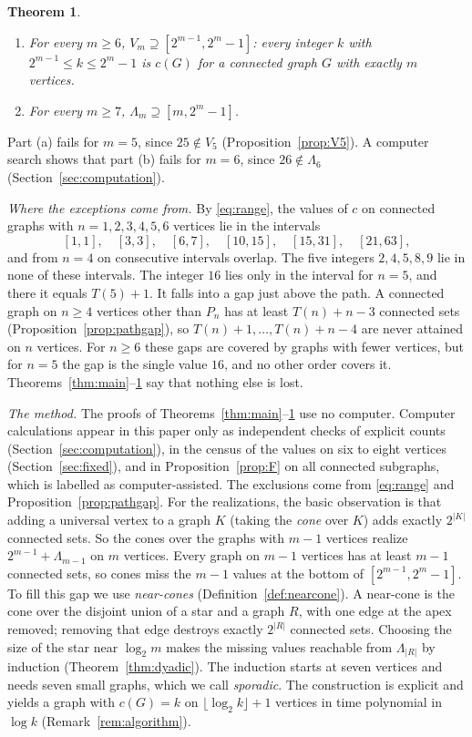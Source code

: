 \documentclass[11pt]{amsart}
\newtheorem{theorem}{Theorem}[section]
\theoremstyle{definition}
\theoremstyle{remark}
\newcommand{\Lam}{\Lambda}
\newcommand{\Tr}[1]{T(#1)}
\begin{document}
\begin{theorem}\label{thm:dyadic-intro}
\begin{enumerate}[label=\textup{(\alph*)}]
\item For every $m\ge6$, $V_m\supseteq[2^{m-1},2^m-1]$: every integer $k$ with $2^{m-1}\le k\le 2^m-1$ is $c(G)$ for a connected graph $G$ with exactly $m$ vertices.
\item For every $m\ge7$, $\Lam_m\supseteq[m,2^m-1]$.
\end{enumerate}
\end{theorem}

Part (a) fails for $m=5$, since $25\notin V_5$ (Proposition~\ref{prop:V5}). A computer search shows that part (b) fails for $m=6$, since $26\notin\Lam_6$ (Section~\ref{sec:computation}).

\emph{Where the exceptions come from.} By \eqref{eq:range}, the values of $c$ on connected graphs with $n=1,2,3,4,5,6$ vertices lie in the intervals
\[
[1,1],\quad[3,3],\quad[6,7],\quad[10,15],\quad[15,31],\quad[21,63],
\]
and from $n=4$ on consecutive intervals overlap. The five integers $2,4,5,8,9$ lie in none of these intervals. The integer $16$ lies only in the interval for $n=5$, and there it equals $\Tr{5}+1$. It falls into a gap just above the path. A connected graph on $n\ge4$ vertices other than $P_n$ has at least $\Tr{n}+n-3$ connected sets (Proposition~\ref{prop:pathgap}), so $\Tr{n}+1,\dots,\Tr{n}+n-4$ are never attained on $n$ vertices. For $n\ge6$ these gaps are covered by graphs with fewer vertices, but for $n=5$ the gap is the single value $16$, and no other order covers it. Theorems~\ref{thm:main}--\ref{thm:dyadic-intro} say that nothing else is lost.

\emph{The method.} The proofs of Theorems~\ref{thm:main}--\ref{thm:dyadic-intro} use no computer. Computer calculations appear in this paper only as independent checks of explicit counts (Section~\ref{sec:computation}), in the census of the values on six to eight vertices (Section~\ref{sec:fixed}), and in Proposition~\ref{prop:F} on all connected subgraphs, which is labelled as computer-assisted. The exclusions come from \eqref{eq:range} and Proposition~\ref{prop:pathgap}. For the realizations, the basic observation is that adding a universal vertex to a graph $K$ (taking the \emph{cone} over $K$) adds exactly $2^{|K|}$ connected sets. So the cones over the graphs with $m-1$ vertices realize $2^{m-1}+\Lam_{m-1}$ on $m$ vertices. Every graph on $m-1$ vertices has at least $m-1$ connected sets, so cones miss the $m-1$ values at the bottom of $[2^{m-1},2^m-1]$. To fill this gap we use \emph{near-cones} (Definition~\ref{def:nearcone}). A near-cone is the cone over the disjoint union of a star and a graph $R$, with one edge at the apex removed; removing that edge destroys exactly $2^{|R|}$ connected sets. Choosing the size of the star near $\log_2m$ makes the missing values reachable from $\Lam_{|R|}$ by induction (Theorem~\ref{thm:dyadic}). The induction starts at seven vertices and needs seven small graphs, which we call \emph{sporadic}. The construction is explicit and yields a graph with $c(G)=k$ on $\lfloor\log_2k\rfloor+1$ vertices in time polynomial in $\log k$ (Remark~\ref{rem:algorithm}).
\end{document}
